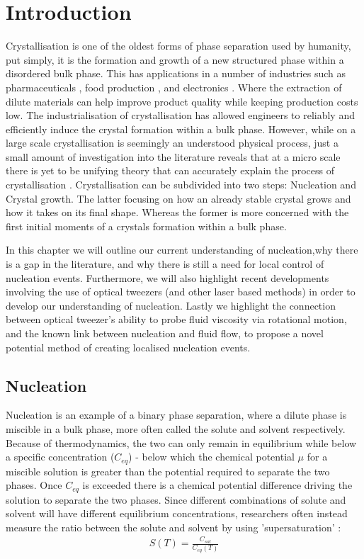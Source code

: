 \chapter{Introduction}
Crystallisation is one of the oldest forms of phase 
separation used by humanity\cite{Schoen1956}, put 
simply, it is the formation and growth of a new 
structured phase within a disordered bulk phase. 
This has applications in a number of industries such 
as pharmaceuticals \cite{Gao2017}, food production 
\cite{Hartel2002}, and electronics \cite{Myerson2002}. 
Where the extraction of dilute materials can help 
improve product quality while keeping production costs 
low. The industrialisation of crystallisation has 
allowed engineers to reliably and efficiently induce 
the crystal formation within a bulk phase. However, 
while on a large scale crystallisation is seemingly an 
understood physical process, just a small amount of 
investigation into the literature reveals that at a 
micro scale there is yet to be unifying theory that can 
accurately explain the process of crystallisation 
\cite{Fu2021}. Crystallisation can be subdivided into 
two steps: Nucleation and Crystal growth. The latter 
focusing on how an already stable crystal grows and how 
it takes on its final shape. Whereas the former is more 
concerned with the first initial moments of a crystals 
formation within a bulk phase.

In this chapter we will outline our current understanding 
of nucleation,why there is a gap in the literature, and why 
there is still a need for local control of nucleation events. 
Furthermore, we will also highlight recent developments 
involving the use of optical tweezers (and other laser based 
methods) in order to develop our understanding of nucleation. 
Lastly we highlight the connection between optical tweezer's 
ability to probe fluid viscosity via rotational motion, and 
the known link between nucleation and fluid flow, to propose 
a novel potential method of creating localised nucleation events.
 
\section{Nucleation}
Nucleation is an example of a binary phase separation, 
where a dilute phase is miscible in a bulk phase, more 
often called the solute and solvent respectively. Because 
of thermodynamics, the two can only remain in equilibrium 
while below a specific concentration ($C_{eq}$) - below 
which the chemical potential $\mu$ for a miscible solution 
is greater than the potential required to separate the two 
phases. Once $C_{eq}$ is exceeded there is a chemical potential 
difference driving the solution to separate the two phases. 
Since different combinations of solute and solvent will 
have different equilibrium concentrations, researchers often 
instead measure the ratio between the solute and solvent by 
using 'supersaturation' \cite{Mullin2001}:
\begin{align}
	\label{eq:supersaturation}
	S(T) = \frac{C_{sol}}{C_{eq}(T)}
\end{align}

